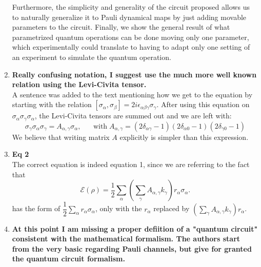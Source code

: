 \documentclass[10pt,letterpaper]{article} %
\begin{document}
\begin{enumerate}
Furthermore, the simplicity and generality of the circuit proposed allows us to
naturally generalize it to Pauli dynamical maps by just
adding movable parameters to the circuit.
Finally, we show the general result of what parametrized quantum operations can be done 
moving only one parameter, which experimentally could translate
to having to adapt only one setting of an experiment
to simulate the quantum operation.




\item \textbf{ Really confusing notation, I suggest use the much more well
known relation using the Levi-Civita tensor.}\\


A sentence was added to the text mentioning how we get to the equation by
starting with the relation $[\sigma_\alpha,\sigma_\beta] = 2 i
\epsilon_{\alpha \beta \gamma} \sigma_\gamma$.
After using this equation on $\sigma_{\alpha} \sigma_{\gamma} \sigma_{\alpha}$, the Levi-Civita tensors are summed out and we are left with:
\begin{equation*}
\sigma_{\gamma} \sigma_{\alpha} \sigma_{\gamma}  =   A_{\alpha,\gamma} \sigma_{\alpha}, \;\;\;\;\;\; \text{with} \; A_{\alpha, \gamma} = (2\delta_{\alpha \gamma}-1)(2\delta_{\alpha 0}-1)(2\delta_{\gamma 0}-1)
\end{equation*}
We believe that writing matrix $A$ explicitly is simpler than this expression. 

\item \textbf{Eq 2} \\

The correct equation is indeed equation 1, since we are referring to the fact that 
\begin{equation}
\label{eq: rho-transformada}
\mathcal{E}(\rho) = \dfrac{1}{2} \sum_{\alpha} \left(\sum_{\gamma} A_{\alpha, \gamma} k_{\gamma} \right) r_{\alpha} \sigma_{\alpha}.
\end{equation}
has the form of $\dfrac{1}{2} \sum_{\alpha} r_{\alpha} \sigma_{\alpha}$, only with the
$r_{\alpha}$ replaced by $\left( \sum_{\gamma} A_{\alpha,\gamma} k_{\gamma} \right) r_{\alpha}$.


\item \textbf{At this point I am missing a proper defiition of a "quantum circuit" consistent with the mathematical formalism. The authors start from the very basic regarding Pauli channels, but give for granted the quantum circuit formalism.} \\


\end{enumerate}
\end{document}
